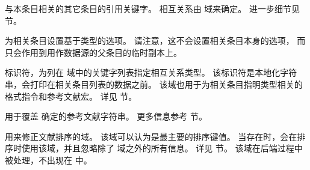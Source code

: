 \begin{fieldlist}
与本条目相关的其它条目的引用关键字。
相互关系由  域来确定。
进一步细节见  节。




为相关条目设置基于类型的选项。
请注意，这不会设置相关条目本身的选项，
而只会作用到用作数据源的父条目的临时副本上。



标识符，为列在  域中的关键字列表指定相互关系类型。
该标识符是本地化字符串，会打印在相关条目列表的数据之前。
该域也用于为相关条目指明类型相关的格式指令和参考文献宏。
详见  节。




用于覆盖  确定的参考文献字符串。
更多信息参考  节。




用来修正文献排序的域。
该域可以认为是最主要的排序键值。
当存在时，\biblatex 会在排序时使用该域，并且忽略除了  域之外的所有信息。
详见  节。
该域在后端过程中被处理，不出现在  中。


\end{fieldlist}
